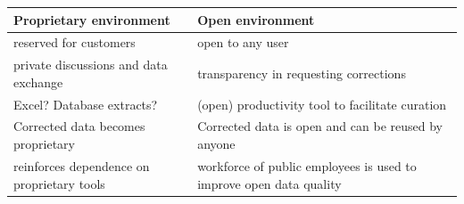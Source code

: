 \documentclass[
]{article}
\begin{document}
\begin{longtable}[]{@{}ll@{}}
\toprule
\begin{minipage}[b]{0.47\columnwidth}\raggedright
\textbf{Proprietary environment}\strut
\end{minipage} & \begin{minipage}[b]{0.47\columnwidth}\raggedright
\textbf{Open environment}\strut
\end{minipage}\tabularnewline
\midrule
\endhead
\begin{minipage}[t]{0.47\columnwidth}\raggedright
reserved for customers\strut
\end{minipage} & \begin{minipage}[t]{0.47\columnwidth}\raggedright
open to any user \strut
\end{minipage}\tabularnewline
\begin{minipage}[t]{0.47\columnwidth}\raggedright
private discussions and data exchange\strut
\end{minipage} & \begin{minipage}[t]{0.47\columnwidth}\raggedright
transparency in requesting corrections\strut
\end{minipage}\tabularnewline
\begin{minipage}[t]{0.47\columnwidth}\raggedright
Excel? Database extracts?\strut
\end{minipage} & \begin{minipage}[t]{0.47\columnwidth}\raggedright
(open) productivity tool to facilitate curation\strut
\end{minipage}\tabularnewline
\begin{minipage}[t]{0.47\columnwidth}\raggedright
Corrected data becomes proprietary\strut
\end{minipage} & \begin{minipage}[t]{0.47\columnwidth}\raggedright
Corrected data is open and can be reused by anyone\strut
\end{minipage}\tabularnewline
\begin{minipage}[t]{0.47\columnwidth}\raggedright
reinforces dependence on proprietary tools\strut
\end{minipage} & \begin{minipage}[t]{0.47\columnwidth}\raggedright
workforce of public employees is used to improve open data quality\strut
\end{minipage}\tabularnewline
\bottomrule
\end{longtable}
\end{document}
